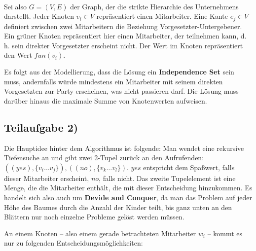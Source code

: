 \documentclass[a4paper, fontsize=10pt]{scrartcl}
\begin{document}
\begin{center}
\\
\end{center}

Sei also $G=(V,E)$ der Graph, der die strikte Hierarchie des Unternehmens darstellt. Jeder Knoten $v_i\in V$ repräsentiert einen Mitarbeiter. Eine Kante $e_j\in V$ definiert zwischen zwei Mitarbeitern die Beziehung Vorgesetzter-Untergebener. Ein grüner Knoten repräsentiert hier einen Mitarbeiter, der teilnehmen kann, d. h. sein direkter Vorgesetzter erscheint nicht. Der Wert im Knoten repräsentiert den Wert $fun(v_i)$.\smallskip

Es folgt aus der Modellierung, dass die Lösung ein \textbf{Independence Set} sein muss, andernfalls würde mindestens ein Mitarbeiter mit seinem direkten Vorgesetzten zur Party erscheinen, was nicht passieren darf. Die Lösung muss darüber hinaus die maximale Summe von Knotenwerten aufweisen.

\subsection*{Teilaufgabe 2)}
Die Hauptidee hinter dem Algorithmus ist folgende: Man wendet eine rekursive Tiefensuche an und gibt zwei 2-Tupel zurück an den Aufrufenden: $((yes),\{v_i\dots v_j\}),((no),\{v_k\dots v_l\})$. $yes$ entspricht dem Spaßwert, falls dieser Mitarbeiter erscheint, $no$, falls nicht. Das zweite Tupelelement ist eine Menge, die die Mitarbeiter enthält, die mit dieser Entscheidung hinzukommen. Es handelt sich also auch um \textbf{Devide and Conquer}, da man das Problem auf jeder Höhe des Baumes durch die Anzahl der Kinder teilt, bis ganz unten an den Blättern nur noch einzelne Probleme gelöst werden müssen.\smallskip

An einem Knoten -- also einem gerade betrachteten Mitarbeiter $w_i$ -- kommt es nur zu folgenden Entscheidungsmöglichkeiten:
\end{document}
